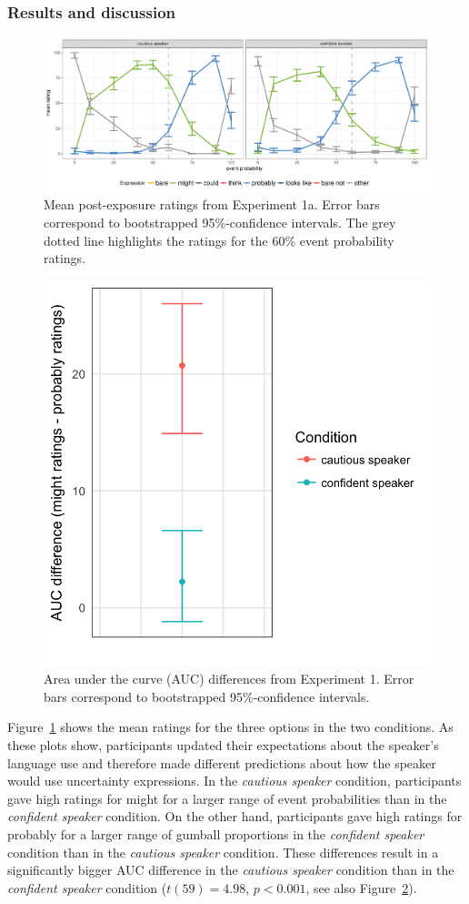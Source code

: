 \documentclass[lucida,biblatex]{sp} %
\begin{document}
\subsubsection{Results and discussion}

\begin{figure}
\includegraphics[width=\textwidth]{plots/exp-1-ratings.pdf}
\caption{Mean post-exposure ratings from Experiment 1a. Error bars correspond to bootstrapped 95\%-confidence intervals.  The grey dotted line highlights the ratings for the 60\% event probability ratings.  \label{fig:adaptation-results-prod}}
\end{figure}

\begin{figure}
\center
\includegraphics[width=.5\textwidth]{plots/adaptation-auc-production.png}
\caption{Area under the curve (AUC) differences from Experiment 1. Error bars correspond to bootstrapped 95\%-confidence intervals.  \label{fig:adaptation-auc-prod}}
\end{figure}

Figure~\ref{fig:adaptation-results-prod} shows the mean ratings for the three options in the two conditions. As these plots show, participants updated their expectations about the speaker's language use and therefore made different predictions about how the speaker would use uncertainty expressions. In the \emph{cautious speaker} condition, participants gave high ratings for {\sc might} for a larger range of event probabilities than in the \emph{confident speaker} condition. On the other hand, participants gave high ratings for {\sc probably} for a larger range of gumball proportions in the \emph{confident speaker} condition than in the \emph{cautious speaker} condition. These differences result in a significantly bigger AUC difference in the \emph{cautious speaker} condition than in the \emph{confident speaker} condition ($t(59) = 4.98$, $p < 0.001$, see also Figure~\ref{fig:adaptation-auc-prod}).
\end{document}
